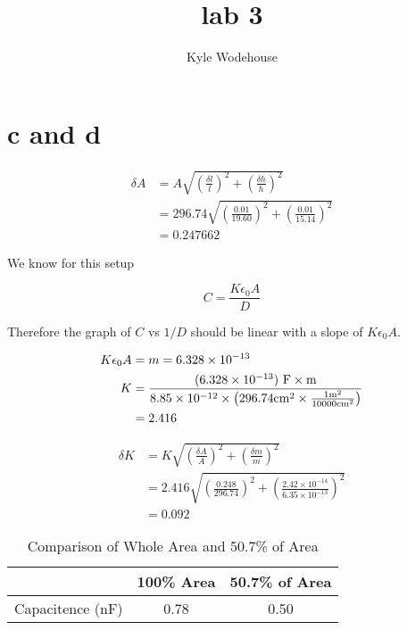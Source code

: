 \documentclass{article}
\title{\bfseries lab 3}
\author{Kyle Wodehouse}
\begin{document}
\maketitle



\section*{c and d}

\begin{align*}
    \delta A &= A \sqrt{ \left( \frac{\delta l}{l} \right)^2 + \left( \frac{\delta h}{h} \right)^2 } \\
    &= 296.74 \sqrt{ \left( \frac{0.01}{19.60} \right)^2 + \left( \frac{0.01}{15.14} \right)^2 } \\
    &= 0.247662
\end{align*}

\vspace{2em}

We know for this setup

\[ C = \frac{K \epsilon_0 A}{D} \]

Therefore the graph of $C$ vs $1/D$ should be linear with a slope of $K  \epsilon_0  A$.

\vspace{2em}

\begin{align*}
    K \epsilon_0 A &= m = 6.328 \times 10^{-13} \\
    K &= \frac{(6.328 \times 10^{-13}) \ \textnormal{F} \times \textnormal{m}}{8.85 \times 10^{-12} \times \left( 296.74 \textnormal{cm}^2 \times \frac{1 \textnormal{m}^2}{10000 \textnormal{cm}^2} \right)} \\
    &= 2.416 
\end{align*}


\begin{align*}
    \delta K &= K \sqrt{ \left( \frac{\delta A}{A} \right)^2 + \left( \frac{\delta m}{m} \right)^2 } \\
    &= 2.416 \sqrt{ \left( \frac{0.248}{296.74} \right)^2 + \left( \frac{2.42 \times 10^{-14}}{6.35 \times 10^{-13}} \right)^2 } \\
    &= 0.092
\end{align*}

\begin{table}[H]
    \centering
    \begin{tabular}{ccc}
    & 100\% Area & 50.7\% of Area \\
    \toprule
    Capacitence (nF) \hspace{1em} \vline& 0.78       & 0.50           \\ 
    \end{tabular}
    \caption{Comparison of Whole Area and 50.7\% of Area}
    \label{tab:area_comparison}
\end{table}
\end{document}
